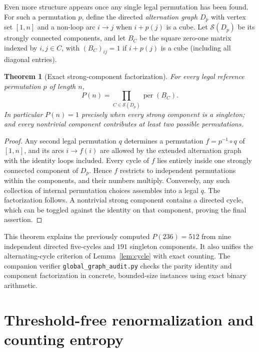 \documentclass[10pt]{article}
\newtheorem{theorem}{Theorem}
\begin{document}
Even more structure appears once any
single legal permutation has been found.
For such a permutation $p$, define the
directed \emph{alternation graph} $D_p$
with vertex set $[1,n]$ and a
non-loop arc $i\to j$ when
$i+p(j)$ is a cube. Let
$\mathcal S(D_p)$ be its strongly
connected components, and let
$B_C$ be the square zero-one matrix
indexed by $i,j\in C$, with
$(B_C)_{ij}=1$ if $i+p(j)$
is a cube (including all diagonal entries).

\begin{theorem}[Exact strong-component factorization]
\label{thm:sccfactor}
For \emph{every} legal reference permutation
$p$ of length $n$,
\begin{equation}\label{eq:sccfactor}
\boxed{\displaystyle
P(n)=\prod_{C\in\mathcal S(D_p)}
\operatorname{per}(B_C).}
\end{equation}
In particular $P(n)=1$ precisely when
every strong component is a singleton;
and every nontrivial component contributes
at least two possible permutations.
\end{theorem}
\begin{proof}
Any second legal permutation $q$
determines a permutation
$f=p^{-1}\circ q$ of $[1,n]$,
and its arcs $i\to f(i)$ are
allowed by the extended alternation
graph with the identity loops included.
Every cycle of $f$ lies entirely
inside one strongly connected
component of $D_p$.
Hence $f$ restricts to independent
permutations within the components,
and their numbers multiply.
Conversely, any such collection of
internal permutation choices assembles
into a legal $q$.
The factorization follows.
A nontrivial strong component contains
a directed cycle, which can be toggled
against the identity on that component,
proving the final assertion.
\end{proof}

This theorem explains the previously
computed $P(236)=512$ from nine
independent directed five-cycles and
$191$ singleton components.
It also unifies the alternating-cycle
criterion of Lemma~\ref{lem:cycle}
with exact counting.
The companion verifier
\texttt{global\_graph\_audit.py} checks
the parity identity and component
factorization in concrete, bounded-size
instances using exact binary arithmetic.

\section{Threshold-free renormalization and counting entropy}
\label{sec:renormalization}
\end{document}
